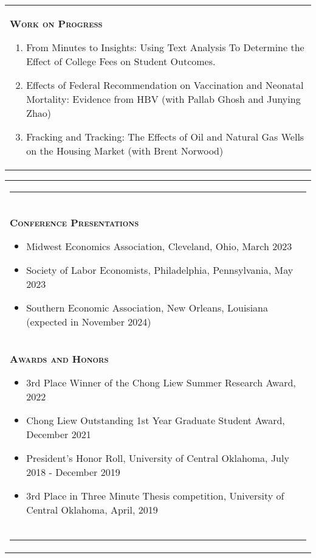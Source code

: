 \documentclass[10pt,letterpaper]{article}
\begin{document}
\begin{tabular}{p{7.5in}}
{\textsc{\textbf{Work on Progress}}}
\begin{enumerate}

\item From Minutes to Insights: Using Text Analysis To Determine the Effect of College Fees on Student Outcomes. 

\item Effects of Federal Recommendation on Vaccination and Neonatal Mortality: Evidence from HBV (with Pallab Ghosh and Junying Zhao)

\item Fracking and Tracking: The Effects of Oil and Natural Gas Wells on the Housing Market (with Brent Norwood)
\end{enumerate}


\end{tabular}



\begin{tabular}{p{7.5in}}
\multicolumn{3}{p{7.5in}}{\hrule}\\[2ex]

	{\large \textsc{\textbf{\large{Conference Presentations}}}}
	\begin{itemize}
    \item Midwest Economics Association,  Cleveland,  Ohio,  March 2023
    \item Society of Labor Economists,  Philadelphia,  Pennsylvania,  May 2023
    \item Southern Economic Association,  New Orleans,  Louisiana (expected in November 2024)
	\end{itemize}
	\\
	
	{\large \textsc{\textbf{\large{Awards and Honors}}}}
	\begin{itemize}
	\item 3rd Place Winner of the Chong Liew Summer Research Award,  2022
    \item Chong Liew Outstanding 1st Year Graduate Student Award, December 2021
    \item President's Honor Roll, University of Central Oklahoma, July 2018 - December 2019
    \item 3rd Place in Three Minute Thesis competition, University of Central Oklahoma, April, 2019
	\end{itemize}
	\\
\multicolumn{3}{p{7.5in}}{\hrule}\\
\end{tabular}
\end{document}

